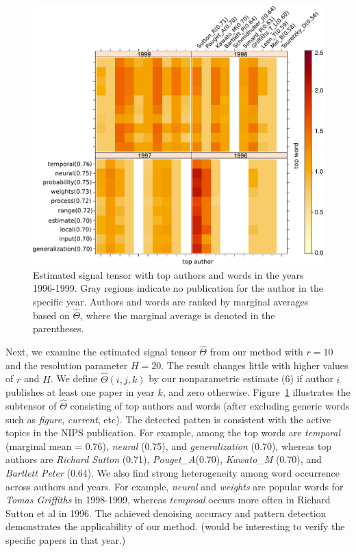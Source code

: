 \documentclass[11pt]{article}
\theoremstyle{plain}
\theoremstyle{definition}
\begin{document}
\vspace{-.5cm}
\begin{figure}[H]
\centering
\includegraphics[width=.45\textwidth]{signal.pdf}
\caption{Estimated signal tensor with top authors and words in the years 1996-1999. Gray regions indicate no publication for the author in the specific year. Authors and words are ranked by marginal averages based on $\hat \Theta$, where the marginal average is denoted in the parentheses.}\label{fig:signal}
\end{figure}

Next, we examine the estimated signal tensor $\hat \Theta$ from our method with $r=10$ and the resolution parameter $H=20$. The result changes little with higher values of $r$ and $H$. We define $\hat \Theta(i,j,k)$ by our nonparametric estimate (6) if author $i$ publishes at least one paper in year $k$, and zero otherwise. Figure~\ref{fig:signal} illustrates the subtensor of $\hat \Theta$ consisting of top authors and words (after excluding generic words such as \emph{figure}, \emph{current}, etc). The detected patten is consistent with the active topics in the NIPS publication. For example, among the top words are \emph{temporal} (marginal mean = 0.76), \emph{neural} (0.75), and \emph{generalization} (0.70), whereas top authors are \emph{Richard Sutton} (0.71), \emph{Pouget\_A}(0.70), \emph{Kawato\_M} (0.70), and \emph{Bartlett Peter} (0.64). We also find strong heterogeneity among word occurrence across authors and years. For example, \emph{neural} and \emph{weights} are popular words for \emph{Tomas Griffiths} in 1998-1999, whereas \emph{temproal} occurs more often in Richard Sutton et al in 1996. The achieved denoising accuracy and pattern detection demonstrates the applicability of our method. {\color{red} (would be interesting to verify the specific papers in that year.) }






\end{document}
